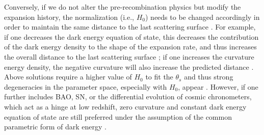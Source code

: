 \documentclass[useAMS,usenatbib]{mnras}
\def\planck{\textit{planck}}
\def\kms {\rm km\,s^{-1}}
\begin{document}
Conversely, if we do not alter the pre-recombination physics but modify the expansion history, the normalization (i.e., $H_{0}$) needs to be changed accordingly in order to maintain the same distance to the last scattering surface \citep{RiessEtal16,Freedman17}.
For example, if one decreases the dark energy equation of state, this decreases the contribution of the dark energy density to the shape of the expansion rate, and thus increases the overall distance to the last scattering surface \citep[e.g.,][]{Linder04}; if one increases the curvature energy density, the negative curvature will also increase the predicted distance \citep[e.g.,][]{EfstathiouEtal03}. 
Above solutions require a higher value of $H_{0}$ to fit the $\theta_{s}$ and thus strong degeneracies in the parameter space, especially with $H_{0}$, appear \citep{planck18parameter}. However, if one further includes BAO, SN, or the differential evolution of cosmic chronometers, which act as a hinge at low redshift, zero curvature and constant dark energy equation of state are still preferred \citep[e.g.,][]{MorescoEtal16,AlamEtal17} under the assumption of the common parametric form of dark energy \citep{Linder03}.
\end{document}
